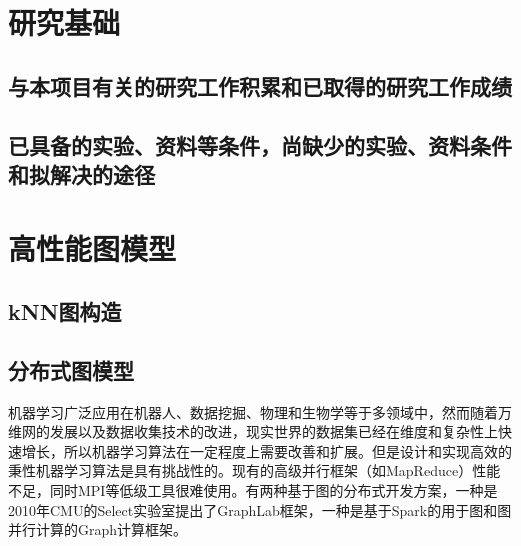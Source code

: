
\chapter{研究基础}
\section{与本项目有关的研究工作积累和已取得的研究工作成绩}

\section{已具备的实验、资料等条件，尚缺少的实验、资料条件和拟解决的途径}
\chapter{高性能图模型}

\section{kNN图构造}

\section{分布式图模型}
机器学习广泛应用在机器人、数据挖掘、物理和生物学等于多领域中，然而随着万维网的发展以及数据收集技术的改进，现实世界的数据集已经在维度和复杂性上快速增长，所以机器学习算法在一定程度上需要改善和扩展。但是设计和实现高效的秉性机器学习算法是具有挑战性的。现有的高级并行框架（如MapReduce）性能不足，同时MPI等低级工具很难使用。有两种基于图的分布式开发方案，一种是2010年CMU的Select实验室提出了GraphLab框架，一种是基于Spark的用于图和图并行计算的Graph计算框架。
